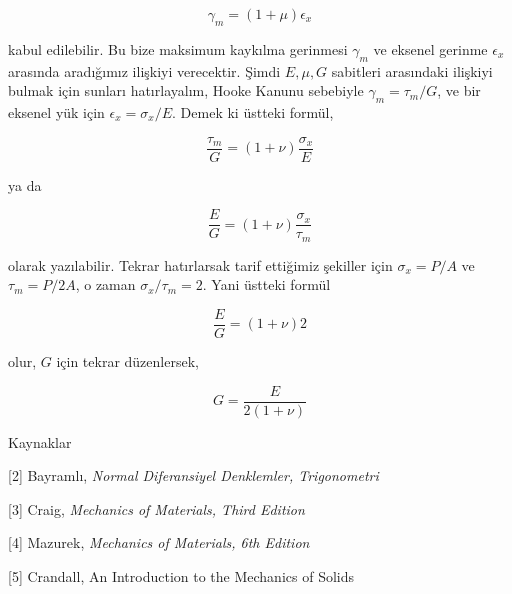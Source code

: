 \documentclass[12pt,fleqn]{article}\usepackage{../../common}
\begin{document}
$$
\gamma_m = (1+\mu) \epsilon_x
$$

kabul edilebilir. Bu bize maksimum kaykılma gerinmesi $\gamma_m$ ve eksenel
gerinme $\epsilon_x$ arasında aradığımız ilişkiyi verecektir. Şimdi $E,\mu,G$
sabitleri arasındaki ilişkiyi bulmak için sunları hatırlayalım, Hooke Kanunu
sebebiyle $\gamma_m = \tau_m / G$, ve bir eksenel yük için $\epsilon_x =
\sigma_x / E$. Demek ki üstteki formül,

$$
\frac{\tau_m}{G} = (1+\nu) \frac{\sigma_x}{E}
$$

ya da

$$
\frac{E}{G} = (1+\nu) \frac{\sigma_x}{\tau_m}
$$

olarak yazılabilir. Tekrar hatırlarsak tarif ettiğimiz şekiller için
$\sigma_x = P / A$ ve $\tau_m = P / 2A$, o zaman $\sigma_x / \tau_m = 2$.
Yani üstteki formül

$$
\frac{E}{G} = (1+\nu) 2
$$

olur, $G$ için tekrar düzenlersek,

$$
G = \frac{E}{2(1+\nu)}
$$

Kaynaklar

[2] Bayramlı, {\em Normal Diferansiyel Denklemler, Trigonometri}

[3] Craig, {\em Mechanics of Materials, Third Edition}

[4] Mazurek, {\em Mechanics of Materials, 6th Edition}

[5] Crandall, An Introduction to the Mechanics of Solids
\end{document}

